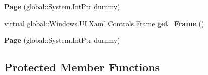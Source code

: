 \begin{DoxyCompactItemize}
{\bfseries Page} (global\+::\+System.\+Int\+Ptr dummy)
\item 
\mbox{\label{class_windows_1_1_u_i_1_1_xaml_1_1_controls_1_1_page_ad1c97890c409b005da06716753f1f058}} 
virtual global\+::\+Windows.\+U\+I.\+Xaml.\+Controls.\+Frame {\bfseries get\+\_\+\+Frame} ()
\item 
\mbox{\label{class_windows_1_1_u_i_1_1_xaml_1_1_controls_1_1_page_a0d54095b2451655f71d73e2e865fb3d9}} 
{\bfseries Page} (global\+::\+System.\+Int\+Ptr dummy)
\end{DoxyCompactItemize}
\subsection*{Protected Member Functions}
